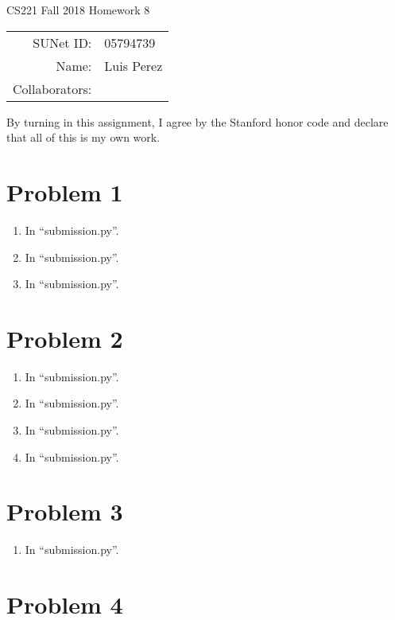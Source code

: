 \documentclass[12pt]{article}
\begin{document}
\begin{center}
{\Large CS221 Fall 2018 Homework 8}

\begin{tabular}{rl}
SUNet ID: & 05794739 \\
Name: & Luis Perez \\
Collaborators: &
\end{tabular}
\end{center}

By turning in this assignment, I agree by the Stanford honor code and declare
that all of this is my own work.

\section*{Problem 1}

\begin{enumerate}[label=(\alph*)]
  \item In ``submission.py''.
  \item In ``submission.py''.
  \item In ``submission.py''.
\end{enumerate}

\section*{Problem 2}

\begin{enumerate}[label=(\alph*)]
  \item In ``submission.py''.
  \item In ``submission.py''.
  \item In ``submission.py''.
  \item In ``submission.py''.
\end{enumerate}

\section*{Problem 3}

\begin{enumerate}[label=(\alph*)]
  \item In ``submission.py''.
\end{enumerate}

\section*{Problem 4}
\end{document}
